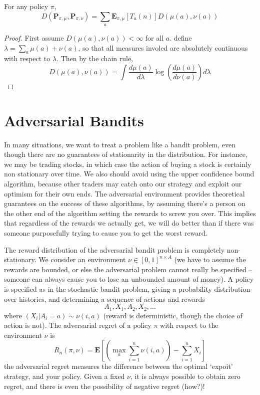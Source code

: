 \begin{lemma}
    For any policy $\pi$,
    \[ D(\mathbf{P}_{\pi, \mu}, \mathbf{P}_{\pi, \nu}) = \sum_a \mathbf{E}_{\pi, \mu}[T_a(n)] D(\mu(a), \nu(a)) \]
\end{lemma}
\begin{proof}
    First assume $D(\mu(a), \nu(a)) < \infty$ for all $a$. define $\lambda = \sum_a \mu(a) + \nu(a)$, so that all measures involed are absolutely continuous with respect to $\lambda$. Then by the chain rule,
    \[ D(\mu(a), \nu(a)) = \int \frac{d\mu(a)}{d \lambda} \log \left( \frac{d\mu(a)}{d\nu(a)} \right) d\lambda \]
\end{proof}

\chapter{Adversarial Bandits}

In many situations, we want to treat a problem like a bandit problem, even though there are no guarantees of stationarity in the distribution. For instance, we may be trading stocks, in which case the action of buying a stock is certainly non stationary over time. We also should avoid using the upper confidence bound algorithm, because other traders may catch onto our strategy and exploit our optimism for their own ends. The adversarial environment provides theoretical guarantees on the success of these algorithms, by assuming there's a person on the other end of the algorithm setting the rewards to screw you over. This implies that regardless of the rewards we actually get, we will do better than if there was someone purposefully trying to cause you to get the worst reward.

The reward distribution of the adversarial bandit problem is completely non-stationary. We consider an environment $\nu \in [0,1]^{n \times A}$ (we have to assume the rewards are bounded, or else the adversarial problem cannot really be specified -- someone can always cause you to lose an unbounded amount of money). A policy is specified as in the stochastic bandit problem, giving a probability distribution over histories, and determining a sequence of actions and rewards
%
\[ A_1, X_1, A_2, X_2, \dots \]
%
where $(X_i | A_i = a) \sim \nu(i,a)$ (reward is deterministic, though the choice of action is not). The adversarial regret of a policy $\pi$ with respect to the environment $\nu$ is
%
\[ R_n(\pi,\nu) = \mathbf{E} \left[\left( \max_a \sum_{i=1}^n \nu(i,a) \right) - \sum_{i = 1}^n X_i \right] \]
%
the adversarial regret measures the difference between the optimal `expoit' strategy, and your policy. Given a fixed $\nu$, it is always possible to obtain zero regret, and there is even the possibility of negative regret (how?)!

